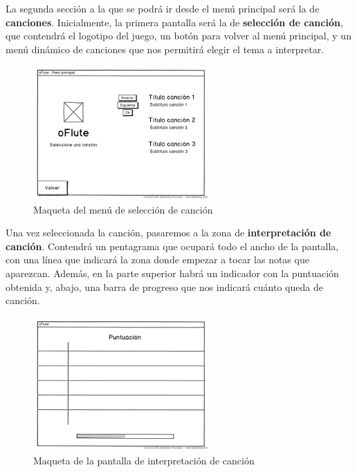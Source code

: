 La segunda sección a la que se podrá ir desde el menú principal será la de
\textbf{canciones}. Inicialmente, la primera pantalla será la de
\textbf{selección de canción}, que contendrá el logotipo del juego, un botón
para volver al menú principal, y un menú dinámico de canciones que nos permitirá
elegir el tema a interpretar.

\begin{figure}[h!]
  \centering
  \includegraphics[width=0.6\textwidth]{desarrollo/mockup_seleccionar_cancion}
  \caption{Maqueta del menú de selección de canción}
\end{figure}

Una vez seleccionada la canción, pasaremos a la zona de \textbf{interpretación
  de canción}. Contendrá un pentagrama que ocupará todo el ancho de la pantalla,
con una línea que indicará la zona donde empezar a tocar las notas que
aparezcan. Además, en la parte superior habrá un indicador con la puntuación
obtenida y, abajo, una barra de progreso que nos indicará cuánto queda de
canción.

\begin{figure}[h!]
  \centering
  \includegraphics[width=0.6\textwidth]{desarrollo/mockup_reproducir_cancion}
  \caption{Maqueta de la pantalla de interpretación de canción}
\end{figure}


